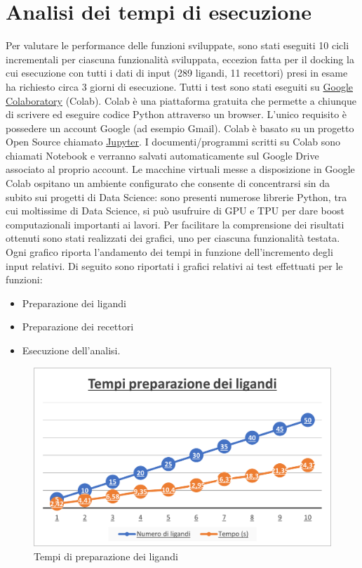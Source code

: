 \section{Analisi dei tempi di esecuzione}
Per valutare le performance delle funzioni sviluppate, sono stati eseguiti 10 cicli incrementali per ciascuna funzionalità sviluppata, eccezion fatta per il docking la cui esecuzione con tutti i dati di input (289 ligandi, 11 recettori) presi in esame ha richiesto circa 3 giorni di esecuzione.\newline
Tutti i test sono stati eseguiti su \href{https://colab.research.google.com/}{Google Colaboratory} (Colab). Colab è una piattaforma gratuita che permette a chiunque di scrivere ed eseguire codice Python attraverso un browser. L’unico requisito è possedere un account Google (ad esempio Gmail). Colab è basato su un progetto Open Source chiamato \href{https://jupyter.org/}{Jupyter}. I documenti/programmi scritti su Colab sono chiamati Notebook e verranno salvati automaticamente sul Google Drive associato al proprio account.\newline
Le macchine virtuali messe a disposizione in Google Colab ospitano un ambiente configurato che consente di concentrarsi sin da subito sui progetti di Data Science:  sono presenti numerose librerie Python, tra cui moltissime di Data Science, si può usufruire di GPU e TPU per dare boost computazionali importanti ai lavori.\newline
Per facilitare la comprensione dei risultati ottenuti sono stati realizzati dei grafici, uno per ciascuna funzionalità testata.\newline
Ogni grafico riporta l'andamento dei tempi in funzione dell'incremento degli input relativi.\newline
Di seguito sono riportati i grafici relativi ai test effettuati per le funzioni:
\begin{itemize}
    \item Preparazione dei ligandi
    \item Preparazione dei recettori
    \item Esecuzione dell'analisi.
\end{itemize}

\begin{figure}[H]
    \centering
    \includegraphics{immagini/capitolo4/tempiLigandi.png}
    \caption{Tempi di preparazione dei ligandi}
    \label{fig:tempi ligandi}
\end{figure}

